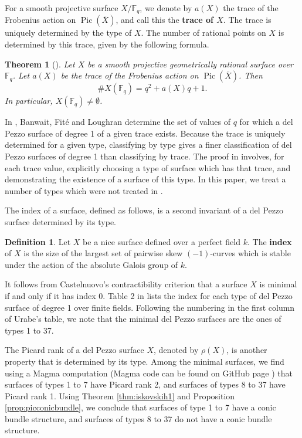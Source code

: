 \documentclass[a4paper, 11pt, reqno]{amsart}
\numberwithin{equation}{section} \numberwithin{figure}{section}
\newcommand{\term}[1]{\textbf{#1}}          %
\DeclareMathOperator{\Pic}{Pic}
\def \F {{\mathbb F}}
\newtheorem{theorem}[lemma]{Theorem}
\theoremstyle{definition}
\newtheorem{definition}[lemma]{Definition}
\numberwithin{lemma}{section}
\begin{document}
For a smooth projective surface $X/\F_q$, we denote by $a(X)$ the trace of the Frobenius action on $\Pic(\overline{X})$, and call this the \term{trace of $X$}. The trace is uniquely determined by the type of $X$. The number of rational points on $X$ is determined by this trace, given by the following formula. 

\begin{theorem}[{\cite[Theorem 27.1]{manin}}]\label{thm:numberrationalpoints}
    Let $X$ be a smooth projective geometrically rational surface over $\F_q$. Let $a(X)$ be the trace of the Frobenius action on $\Pic(\overline{X})$. Then \[\#X(\F_q) = q^2 + a(X)q + 1.\]
    In particular, $X(\F_q) \neq \emptyset$.
\end{theorem}

In \cite[Theorem 1.5]{BFL}, Banwait, Fit\'{e} and Loughran determine the set of values of $q$ for which a del Pezzo surface of degree 1 of a given trace exists. Because the trace is uniquely determined for a given type, classifying by type gives a finer classification of del Pezzo surfaces of degree 1 than classifying by trace. The proof in \cite{BFL} involves, for each trace value, explicitly choosing a type of surface which has that trace, and demonstrating the existence of a surface of this type. In this paper, we treat a number of types which were not treated in \cite{BFL}.

The index of a surface, defined as follows, is a second invariant of a del Pezzo surface determined by its type.

\begin{definition}
    Let $X$ be a nice surface defined over a perfect field $k$. The \term{index} of $X$ is the size of the largest set of pairwise skew $(-1)$-curves which is stable under the action of the absolute Galois group of $k$. 
\end{definition}

It follows from Castelnuovo's contractibility criterion \cite[Theorem 9.3.3]{poonen} that a surface $X$ is minimal if and only if it has index 0. Table 2 in \cite{urabe2} lists the index for each type of del Pezzo surface of degree 1 over finite fields. Following the numbering in the first column of Urabe's table, we note that the minimal del Pezzo surfaces are the ones of types 1 to 37.

The Picard rank of a del Pezzo surface $X$, denoted by $\rho(X)$, is another property that is determined by its type. Among the minimal surfaces, we find using a Magma \cite{magma} computation (Magma code can be found on GitHub page \cite{github_Existence_dP1}) that surfaces of types 1 to 7 have Picard rank 2, and surfaces of types 8 to 37 have Picard rank 1. Using Theorem \ref{thm:iskovskih1} and Proposition \ref{prop:picconicbundle}, we conclude that surfaces of type 1 to 7 have a conic bundle structure, and surfaces of types 8 to 37 do not have a conic bundle structure.
\end{document}
